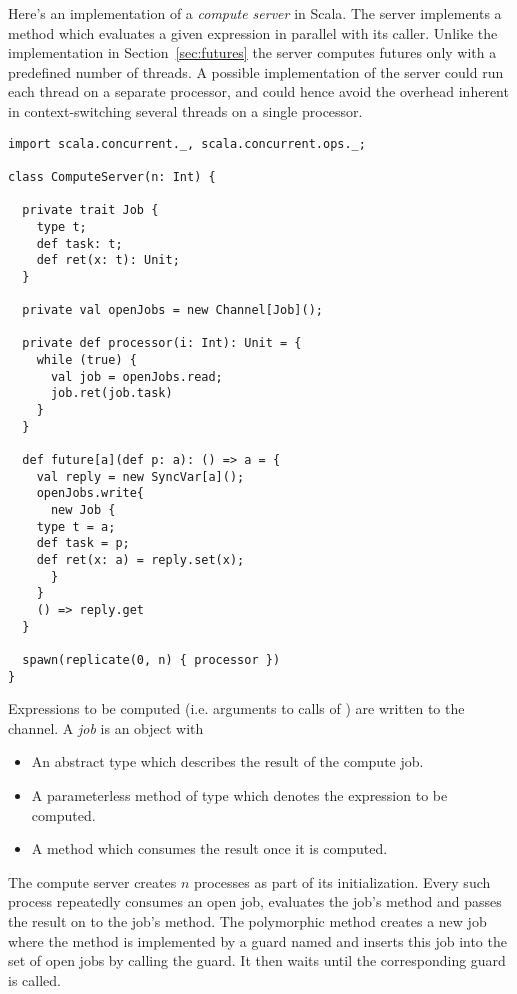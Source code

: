 {Here's an implementation of a {\em compute server} in Scala. The
server implements a  method which evaluates a given
expression in parallel with its caller. Unlike the implementation in
Section~\ref{sec:futures} the server computes futures only with a
predefined number of threads. A possible implementation of the server
could run each thread on a separate processor, and could hence avoid
the overhead inherent in context-switching several threads on a single
processor.

\begin{lstlisting}
import scala.concurrent._, scala.concurrent.ops._;

class ComputeServer(n: Int) {

  private trait Job {
    type t;
    def task: t;
    def ret(x: t): Unit;
  }

  private val openJobs = new Channel[Job]();

  private def processor(i: Int): Unit = {
    while (true) {
      val job = openJobs.read;
      job.ret(job.task) 
    }
  }

  def future[a](def p: a): () => a = {
    val reply = new SyncVar[a]();
    openJobs.write{
      new Job { 
	type t = a;
	def task = p;
	def ret(x: a) = reply.set(x);
      }
    }
    () => reply.get
  }

  spawn(replicate(0, n) { processor })
}
\end{lstlisting}
Expressions to be computed (i.e. arguments
to calls of ) are written to the 
channel. A {\em job} is an object with
\begin{itemize}
\item
An abstract type  which describes the result of the compute
job.
\item
A parameterless  method of type  which denotes
the expression to be computed.
\item
A  method which consumes the result once it is
computed.
\end{itemize}
The compute server creates $n$  processes as part of
its initialization.  Every such process repeatedly consumes an open
job, evaluates the job's  method and passes the result on
to the job's
 method. The polymorphic  method creates
a new job where the  method is implemented by a guard
named  and inserts this job into the set of open jobs by
calling the  guard. It then waits until the corresponding
 guard is called.

}
